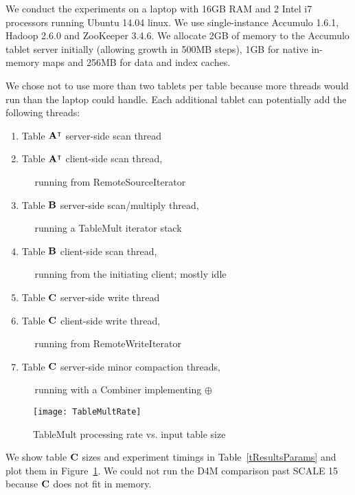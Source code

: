 We conduct the experiments on a laptop with 16GB RAM and 2 Intel i7 processors %
running Ubuntu 14.04 linux. We use single-instance Accumulo 1.6.1, Hadoop 2.6.0 and ZooKeeper 3.4.6.
We allocate 2GB of memory to the Accumulo tablet server initially
(allowing growth in 500MB steps),
1GB for native in-memory maps and 256MB for data and index caches.


We chose not to use more than two tablets per table because more threads would run
than the laptop could handle.  Each additional tablet can potentially add the following threads:
\begin{enumerate}
\item Table $\mathbf{A}^{\intercal}$ server-side scan thread
\item Table $\mathbf{A}^{\intercal}$ client-side scan thread,

$\quad$ running from RemoteSourceIterator
\item Table $\mathbf{B}$ server-side scan/multiply thread,

$\quad$ running a TableMult iterator stack
\item Table $\mathbf{B}$ client-side scan thread, 

$\quad$ running from the initiating client; mostly idle
\item Table $\mathbf{C}$ server-side write thread
\item Table $\mathbf{C}$ client-side write thread,

$\quad$ running from RemoteWriteIterator
\item Table $\mathbf{C}$ server-side minor compaction threads,

$\quad$ running with a Combiner implementing $\oplus$
\end{enumerate}

\begin{figure}[tbh]
\vspace{-6pt}
\centering
\texttt{[image: TableMultRate]}
\caption{TableMult processing rate vs. input table size}
\label{fTableMultPerf}
\vspace{-4pt}
\end{figure}

We show table $\mathbf{C}$ sizes and experiment timings in Table~\ref{tResultsParams}
and plot them in Figure~\ref{fTableMultPerf}.
We could not run the D4M comparison past SCALE 15 because $\mathbf{C}$ does not fit in memory.

